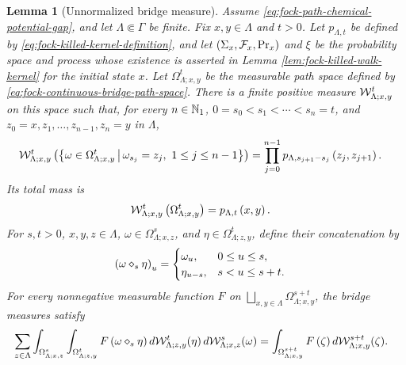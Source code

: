 \documentclass[11pt,a4paper]{article}
\theoremstyle{plain}
\newtheorem{lem}[thm]{Lemma}
\theoremstyle{definition}
\theoremstyle{remark}
\begin{document}
\begin{lem}[Unnormalized bridge measure]\label{lem:fock-unnormalized-bridge-measure}
Assume \eqref{eq:fock-path-chemical-potential-gap}, and let $\Lambda\Subset\Gamma$ be finite.
Fix $x,y\in\Lambda$ and $t>0$.
Let $p_{\Lambda,t}$ be defined by \eqref{eq:fock-killed-kernel-definition}, and let
$\left( \Sigma_x,\mathcal{F}_x,\mathrm{Pr}_x \right)$ and $\xi$ be the probability space and process whose existence is
asserted in Lemma \ref{lem:fock-killed-walk-kernel} for the initial state $x$.
Let $\Omega_{\Lambda;x,y}^{t}$ be the measurable path space defined by
\eqref{eq:fock-continuous-bridge-path-space}.
There is a finite positive measure $\mathcal{W}_{\Lambda;x,y}^{t}$ on this space such that, for every
$n\in\mathbb{N}_1$, $0=s_0<s_1<\cdots<s_n=t$, and
$z_0=x,z_1,\ldots,z_{n-1},z_n=y$ in $\Lambda$,
\begin{equation}
\begin{aligned}
\mathcal{W}_{\Lambda;x,y}^{t} \left( 
\left\{\omega\in\Omega_{\Lambda;x,y}^{t} \, \middle| \, \omega_{s_j}=z_j,\ 1\leq j\leq n-1\right\} \right)
& =
\prod_{j=0}^{n-1}
p_{\Lambda,s_{j+1}-s_j} \left( z_j,z_{j+1} \right).
\end{aligned}
\label{eq:fock-bridge-cylinder-distribution}
\end{equation}
Its total mass is
\begin{equation}
\begin{aligned}
\mathcal{W}_{\Lambda;x,y}^{t} \left( \Omega_{\Lambda;x,y}^{t} \right)
& =
p_{\Lambda,t} \left( x,y \right).
\end{aligned}
\label{eq:fock-bridge-total-mass}
\end{equation}
For $s,t>0$, $x,y,z\in\Lambda$,
$\omega\in\Omega_{\Lambda;x,z}^{s}$, and
$\eta\in\Omega_{\Lambda;z,y}^{t}$, define their concatenation by
$$\begin{aligned}
\left( \omega\diamond_s\eta \right)_u
& =
\begin{cases}
\omega_u, & 0\leq u\leq s,\\
\eta_{u-s}, & s<u\leq s+t.
\end{cases}
\end{aligned}$$
For every nonnegative measurable function $F$ on
$\bigsqcup_{x,y\in\Lambda}\Omega_{\Lambda;x,y}^{s+t}$, the bridge measures satisfy
\begin{equation}
\begin{aligned}
&
\sum_{z\in\Lambda}
\int_{\Omega_{\Lambda;x,z}^{s}}
\int_{\Omega_{\Lambda;z,y}^{t}}
F \left( \omega\diamond_s\eta \right)
\mathop{d \mathcal{W}_{\Lambda;z,y}^{t}}(\eta)
\mathop{d \mathcal{W}_{\Lambda;x,z}^{s}}(\omega)
=
\int_{\Omega_{\Lambda;x,y}^{s+t}}
F \left( \zeta \right)
\mathop{d \mathcal{W}_{\Lambda;x,y}^{s+t}}(\zeta).
\end{aligned}
\label{eq:fock-bridge-convolution-law}
\end{equation}
\end{lem}
\end{document}
